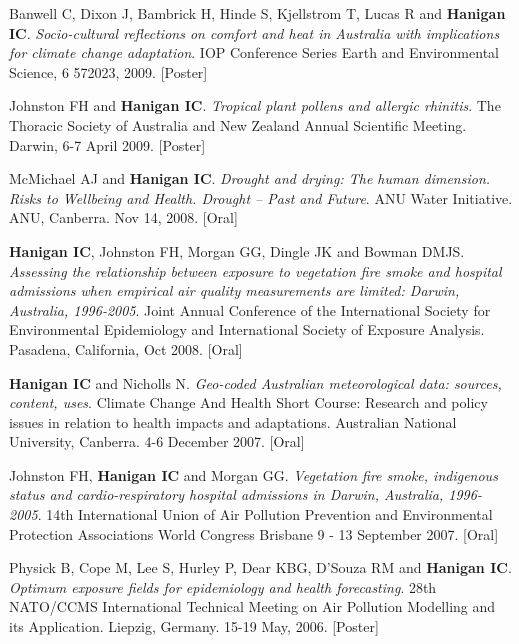 \documentclass[a4paper,11pt]{article}
\begin{document}
\begin{revnumerate}
\item Banwell C, Dixon J, Bambrick H, Hinde S, Kjellstrom T, Lucas R and \textbf{Hanigan IC}. \emph{Socio-cultural reflections on comfort and heat in Australia with implications for climate change adaptation}. IOP Conference Series Earth and Environmental Science, 6 572023, 2009. [Poster]

\item Johnston FH and \textbf{Hanigan IC}.  \emph{Tropical plant pollens and allergic rhinitis}.  The Thoracic Society of Australia and New Zealand Annual Scientific Meeting.  Darwin, 6-7 April 2009. [Poster]

\item McMichael AJ and \textbf{Hanigan IC}. \emph{Drought and drying: The human dimension. Risks to Wellbeing and Health. Drought – Past and Future}. ANU Water Initiative. ANU, Canberra. Nov 14, 2008. [Oral]

\item \textbf{Hanigan IC}, Johnston FH, Morgan GG, Dingle JK and Bowman DMJS. \emph{Assessing the relationship between exposure to vegetation fire smoke and hospital admissions when empirical air quality measurements are limited: Darwin, Australia, 1996-2005}. Joint Annual Conference of the International Society for Environmental Epidemiology and International Society of Exposure Analysis. Pasadena, California, Oct 2008. [Oral]

\item \textbf{Hanigan IC} and Nicholls N. \emph{Geo-coded Australian meteorological data: sources, content, uses}. Climate Change And Health Short Course: Research and policy issues in relation to health impacts and adaptations.  Australian National University, Canberra. 4-6 December 2007. [Oral]

\item Johnston FH, \textbf{Hanigan IC} and Morgan GG. \emph{Vegetation fire smoke, indigenous status and cardio-respiratory hospital admissions in Darwin, Australia, 1996-2005}. 14th International Union of Air Pollution Prevention and Environmental Protection Associations World Congress Brisbane 9 - 13 September 2007. [Oral]

\item Physick B, Cope M, Lee S, Hurley P, Dear KBG, D’Souza RM and \textbf{Hanigan IC}. \emph{Optimum exposure fields for epidemiology and health forecasting}. 28th NATO/CCMS International Technical Meeting on Air Pollution Modelling and its Application. Liepzig, Germany. 15-19 May, 2006. [Poster]


\end{revnumerate}
\end{document}
